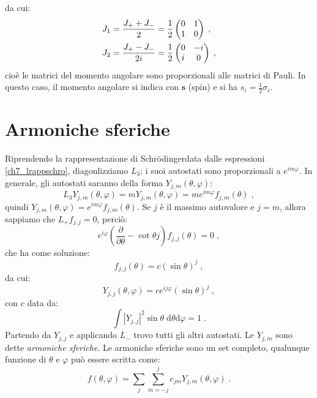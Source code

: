 \documentclass[10pt,a4paper]{report}
\theoremstyle{definition}
\numberwithin{equation}{section}
\newcommand{\diff}[1][]{\mathrm{d}#1}
\newcommand{\Sch}{Schrödinger}
\begin{document}
da cui:
\begin{align}
J_1=\frac{J_+ +J_-}{2}&=\frac{1}{2}\left(\begin{matrix}
0 & 1 \\
1 & 0
\end{matrix}\right)\;, \notag \\
J_2=\frac{J_+ - J_-}{2i}&=\frac{1}{2}\left(\begin{matrix}
0 & -i \\
i & 0
\end{matrix}\right)\;,
\end{align}
cioè le matrici del momento angolare sono proporzionali alle matrici di Pauli. In questo caso, il momento angolare si indica con $\mathbf{s}$ (spin) e si ha $s_i=\frac{1}{2}\sigma_i$.
\section{Armoniche sferiche}
Riprendendo la rappresentazione di \Sch data dalle espressioni \eqref{ch7_lrappschro}, diagonlizziamo $L_3$: i suoi autostati sono proporzionali a $e^{im\varphi}$. In generale, gli autostati saranno della forma $Y_{j,m}(\theta,\varphi)$:
\begin{equation}
L_3Y_{j,m}(\theta,\varphi)=mY_{j,m}(\theta,\varphi)=me^{im\varphi}f_{j,m}(\theta)\;,
\end{equation}
quindi $Y_{j,m}(\theta,\varphi)=e^{im\varphi}f_{j,m}(\theta)$. Se $j$ è il massimo autovalore e $j=m$, allora sappiamo che $L_+f_{j,j}=0$, perciò:
\begin{equation}
e^{i\varphi}\left(\frac{\partial}{\partial\theta}-\cot\theta j\right)f_{j,j}(\theta)=0\;,
\end{equation}
che ha come soluzione:
\begin{equation}
f_{j,j}(\theta)=c(\sin\theta)^j\;,
\end{equation}
da cui:
\begin{equation}
Y_{j,j}(\theta,\varphi)=ce^{ij\varphi}(\sin\theta)^j\;,
\end{equation}
con $c$ data da:
\begin{equation}
\int |Y_{j,j}|^2\sin\theta\;\diff{\theta}\diff{\varphi}=1\;.
\end{equation}
Partendo da $Y_{j,j}$ e applicando $L_-$ trovo tutti gli altri autostati. Le $Y_{j,m}$ sono dette \textit{armoniche sferiche}. Le armoniche sferiche sono un set completo, qualunque funzione di $\theta$ e $\varphi$ può essere scritta come:
\begin{equation}
f(\theta,\varphi)=\sum_j\sum_{m=-j}^j c_{jm}Y_{j,m}(\theta,\varphi)\;.
\end{equation}
\end{document}
